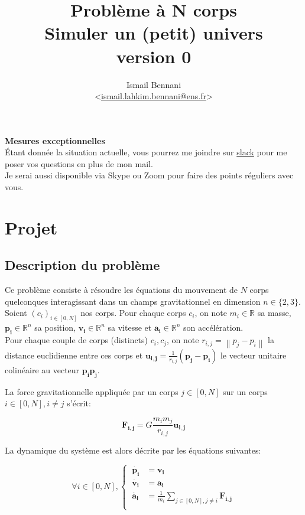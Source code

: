 \documentclass{article}
\title{\textbf{Problème à N corps} \\
       \Large Simuler un (petit) univers\\
       \small version 0}
\author{Ismail Bennani \\
        <\href{mailto:ismail.lahkim.bennani@ens.fr}{ismail.lahkim.bennani@ens.fr}>}
\newcommand{\norm}[1]{\left\lVert#1\right\rVert}
\newcommand{\myvec}[1]{\ensuremath{\mathbf{#1}}}
\begin{document}
\maketitle

\noindent\textbf{Mesures exceptionnelles}\\
Étant donnée la situation actuelle, vous pourrez me joindre sur \href{https://join.slack.com/t/in104n-bodyproblem/shared_invite/zt-cu07sew6-nw8ikZtOZBy2UmpqReQdWA}{slack} pour me poser vos questions en plus de mon mail.\\
Je serai aussi disponible via Skype ou Zoom pour faire des points réguliers avec vous.


\section{Projet}

\subsection{Description du problème}

Ce problème consiste à résoudre les équations du mouvement de $N$ corps quelconques interagissant dans un champs gravitationnel en dimension ${n\in \{ 2,3 \}}$.\\
Soient $(c_i)_{i\in[0,N]}$ nos corps. Pour chaque corps $c_i$, on note $m_i \in \mathbb{R}$ sa masse, $\myvec{p_i} \in \mathbb{R}^n$ sa position, $\myvec{v_i} \in \mathbb{R}^n$ sa vitesse et $\myvec{a_i} \in \mathbb{R}^n$ son accélération.\\
Pour chaque couple de corps (distincts) $c_i, c_j$, on note $r_{i,j} = \norm{p_j - p_i}$ la distance euclidienne entre ces corps et $\myvec{u_{i,j}} = \frac{1}{r_{i,j}}(\myvec{p_j}-\myvec{p_i})$ le vecteur unitaire colinéaire au vecteur $\myvec{p_ip_j}$.

La force gravitationnelle appliquée par un corps $j \in [0,N]$ sur un corps $i \in [0,N], i \ne j$ s'écrit:

\begin{equation*}
    \myvec{F_{i,j}} = G \frac{m_im_j}{r_{i,j}} \myvec{u_{i,j}}
\end{equation*}

La dynamique du système est alors décrite par les équations suivantes:

\begin{equation*}
\forall i \in [0,N], \left\{\begin{aligned}
    \ \myvec{\dot{p_i}} & = \myvec{v_i} \\
    \ \myvec{\dot{v_i}} & = \myvec{a_i} \\
    \ \myvec{\dot{a_i}} & = \frac{1}{m_i} \sum_{j \in [0,N], j \ne i} \myvec{F_{i,j}} \\
\end{aligned}\right.
\end{equation*}
\end{document}
